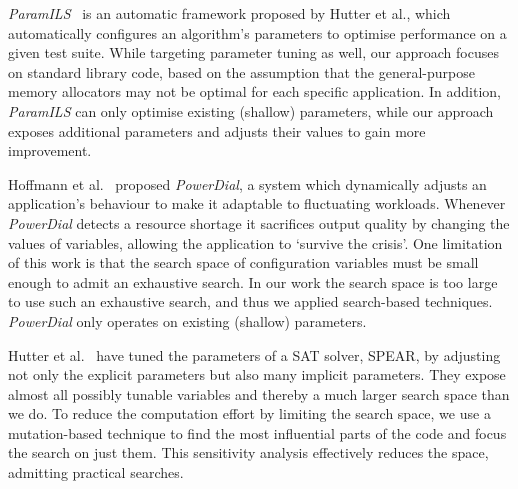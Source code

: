 \emph{ParamILS}~\cite{hutter2009paramils} is an automatic framework proposed by Hutter et al.,
which automatically configures an algorithm's parameters to optimise
performance on a given test suite. 
While
targeting parameter tuning as well, our approach focuses on standard
library code, based on the assumption that the general-purpose memory
allocators may not be optimal for each specific application. In addition,
\emph{ParamILS} can only optimise existing (shallow) parameters, while our
approach exposes additional parameters and adjusts their values to gain more
improvement.

Hoffmann et al.~\cite{Hoffmann:2011:DKR:1950365.1950390} proposed
\emph{PowerDial}, a system which dynamically adjusts an application's
behaviour to make it adaptable to fluctuating workloads. 
Whenever \emph{PowerDial} detects a resource shortage it sacrifices 
output quality by changing the values of variables, allowing
the application to `survive the crisis'. One limitation of
this work is that the search space of configuration variables must be small
enough to admit an exhaustive search. In our work the search space is too
large to use such an exhaustive search, and thus we applied search-based
techniques. %
\emph{PowerDial} only operates
on existing (shallow) parameters. 

Hutter et al.~\cite{4401979} have tuned the parameters of a SAT
solver, SPEAR, by adjusting not only the explicit parameters but also many
implicit parameters. They expose almost all possibly tunable variables 
and thereby a much larger search space than we do. 
To reduce the
computation effort by limiting the search space, we use a mutation-based
technique to find the most influential parts of the code and focus the search
on just them. 
This sensitivity analysis effectively reduces the 
space, admitting practical searches.

